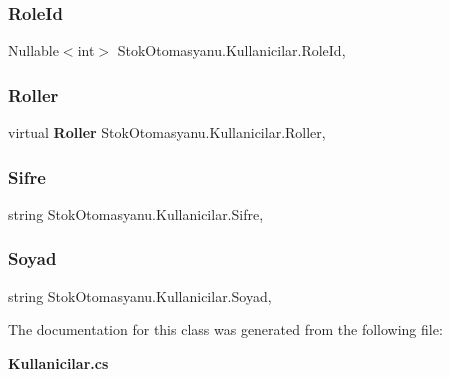 \subsubsection{Role\+Id}
{\footnotesize\ttfamily Nullable$<$int$>$ Stok\+Otomasyanu.\+Kullanicilar.\+Role\+Id\hspace{0.3cm}{\ttfamily [get]}, {\ttfamily [set]}}

\mbox{\label{class_stok_otomasyanu_1_1_kullanicilar_aa8f57d01ebd2734ced1a25c7e65dbcde}} 
\subsubsection{Roller}
{\footnotesize\ttfamily virtual \textbf{ Roller} Stok\+Otomasyanu.\+Kullanicilar.\+Roller\hspace{0.3cm}{\ttfamily [get]}, {\ttfamily [set]}}

\mbox{\label{class_stok_otomasyanu_1_1_kullanicilar_a144eed49d04ba8f2f23d365dd8659c3c}} 
\subsubsection{Sifre}
{\footnotesize\ttfamily string Stok\+Otomasyanu.\+Kullanicilar.\+Sifre\hspace{0.3cm}{\ttfamily [get]}, {\ttfamily [set]}}

\mbox{\label{class_stok_otomasyanu_1_1_kullanicilar_a2643e8d2735ffccf4d6bc0104477c711}} 
\subsubsection{Soyad}
{\footnotesize\ttfamily string Stok\+Otomasyanu.\+Kullanicilar.\+Soyad\hspace{0.3cm}{\ttfamily [get]}, {\ttfamily [set]}}



The documentation for this class was generated from the following file\+:\begin{DoxyCompactItemize}
\item 
\textbf{ Kullanicilar.\+cs}\end{DoxyCompactItemize}
